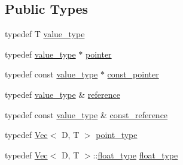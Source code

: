 \subsection*{Public Types}
\begin{DoxyCompactItemize}
\item 
typedef T \hyperlink{classtrimesh_1_1Box_aa78431130c7bda4a326f3a23da88ba82}{value\+\_\+type}
\item 
typedef \hyperlink{classtrimesh_1_1Box_aa78431130c7bda4a326f3a23da88ba82}{value\+\_\+type} $\ast$ \hyperlink{classtrimesh_1_1Box_a9047216c8a8bf0b23b12fbf08f1b4cb6}{pointer}
\item 
typedef const \hyperlink{classtrimesh_1_1Box_aa78431130c7bda4a326f3a23da88ba82}{value\+\_\+type} $\ast$ \hyperlink{classtrimesh_1_1Box_a9a9725eafb98d3340e22db0f9be77068}{const\+\_\+pointer}
\item 
typedef \hyperlink{classtrimesh_1_1Box_aa78431130c7bda4a326f3a23da88ba82}{value\+\_\+type} \& \hyperlink{classtrimesh_1_1Box_af56328ba73f0070abeeef8b1ae82a12d}{reference}
\item 
typedef const \hyperlink{classtrimesh_1_1Box_aa78431130c7bda4a326f3a23da88ba82}{value\+\_\+type} \& \hyperlink{classtrimesh_1_1Box_ac674585eb2cf25c8749bd677ff25eaa7}{const\+\_\+reference}
\item 
typedef \hyperlink{classtrimesh_1_1Vec}{Vec}$<$ D, T $>$ \hyperlink{classtrimesh_1_1Box_a208c806781f96a7001491a275dfa7655}{point\+\_\+type}
\item 
typedef \hyperlink{classtrimesh_1_1Vec}{Vec}$<$ D, T $>$\+::\hyperlink{classtrimesh_1_1Box_aa3a7238ce00e96ceaf24ecbb1077b7a4}{float\+\_\+type} \hyperlink{classtrimesh_1_1Box_aa3a7238ce00e96ceaf24ecbb1077b7a4}{float\+\_\+type}
\end{DoxyCompactItemize}
